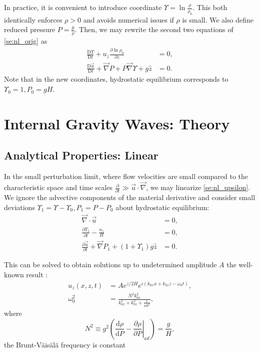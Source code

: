 \documentclass[
        fleqn,
        usenatbib,
    ]{mnras}
\newcommand*{\rd}[2]{\frac{\mathrm{d}#1}{\mathrm{d}#2}}
\newcommand*{\pd}[2]{\frac{\partial#1}{\partial#2}}
\newcommand*{\md}[2]{\frac{\mathrm{D}#1}{\mathrm{D}#2}}
\newcommand*{\at}[1]{\left.#1\right|}
\newcommand*{\p}[1]{\left(#1\right)}
\begin{document}
In practice, it is convenient to introduce coordinate $\Upsilon = \ln
\frac{\rho}{\rho_0}$. This both identically enforces $\rho > 0$ and avoids
numerical issues if $\rho$ is small. We also define reduced pressure $P =
\frac{p}{\rho}$. Then, we may rewrite the second two equations of
\autoref{se:nl_orig} as
\begin{subequations}\label{se:nl_upsilon}
    \begin{align}
        \md{\Upsilon}{t} + u_z \pd{\ln \rho_0}{z} &= 0,\label{eq:nl_up_density}
            \\
        \md{\vec{u}}{t} + \vec{\nabla}P + P\vec{\nabla}\Upsilon + g\hat{z} &= 0.
    \end{align}
\end{subequations}
Note that in the new coordinates, hydrostatic equilibrium corresponds to
$\Upsilon_0 = 1, P_0 = gH$.

\section{Internal Gravity Waves: Theory}\label{s:theory}

\subsection{Analytical Properties: Linear}

In the small perturbation limit, where flow velocities are small compared to the
characteristic space and time scales $\pd{}{t} \gg \vec{u} \cdot \vec{\nabla}$,
we may linearize \autoref{se:nl_upsilon}. We ignore the advective components of the
material derivative and consider small deviations $\Upsilon_1 = \Upsilon -
\Upsilon_0, P_1 = P - P_0$ about hydrostatic equilibrium:
\begin{subequations}\label{se:lin_homo}
    \begin{align}
        \vec{\nabla} \cdot \vec{u} &= 0,\\
        \pd{\Upsilon_1}{t} - \frac{u_{z}}{H} &= 0,\\
        \pd{\vec{u}}{t} + \vec{\nabla}P_1
            + \p{1 + \Upsilon_1} g\hat{z}
            &= 0.
    \end{align}
\end{subequations}

This can be solved to obtain solutions up to undetermined amplitude $A$ the
well-known result \citep{drazin,sutherland0}:
\begin{subequations}\label{se:lin_sol}
    \begin{align}
        u_z\p{x, z, t} &= Ae^{z/2H}e^{i(k_{0x}x + k_{0z}z - \omega_0 t)},\\
        \omega_0^2 &= \frac{N^2k_{0x}^2}{k_{0x}^2 + k_{0z}^2 + \frac{1}{4H^2}},
            \label{eq:disp_rel}
    \end{align}
\end{subequations}
where
\begin{equation}
    N^2 \equiv g^2\p{\rd{\rho}{P} - \at{\pd{\rho}{P}}_{ad}}
        = \frac{g}{H},
\end{equation}
the Brunt-V\"ais\"al\"a frequency is constant
\end{document}
